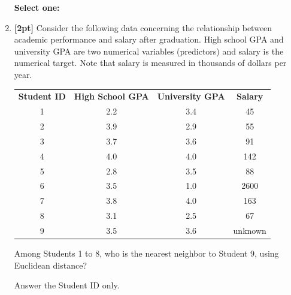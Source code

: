 \documentclass[12pt]{article}
\renewcommand{\circle}{\tikz\draw[black] (0,0) circle (1ex);}
\begin{document}
\begin{enumerate}
    \textbf{Select one:}
    
 
    \clearpage
    \item \textbf{[2pt]} Consider the following data concerning the relationship between academic performance and salary after graduation. High school GPA and university GPA are two numerical variables (predictors) and salary is the numerical target. Note that salary is measured in thousands of dollars per year.
    
    \begin{table}[H]
        \centering
        \begin{tabular}{cccc}
            \textbf{Student ID} & \textbf{High School GPA} & \textbf{University GPA} & \textbf{Salary} \\
            1 & 2.2 & 3.4 & 45 \\
            2 & 3.9 & 2.9 & 55 \\
            3 & 3.7 & 3.6 & 91 \\
            4 & 4.0 & 4.0 & 142 \\
            5 & 2.8 & 3.5 & 88 \\
            6 & 3.5 & 1.0 & 2600 \\
            7 & 3.8 & 4.0 & 163 \\
            8 & 3.1 & 2.5 & 67 \\
            9 & 3.5 & 3.6 & unknown \\
        \end{tabular}
        \label{tab:my_label}
    \end{table}
    
    Among Students 1 to 8, who is the nearest neighbor to Student 9, using Euclidean distance?
    
    Answer the Student ID only.

    \begin{tcolorbox}[fit,height=1cm, width=4cm, blank, borderline={1pt}{-2pt},nobeforeafter]
    \end{tcolorbox}


\end{enumerate}
\end{document}
